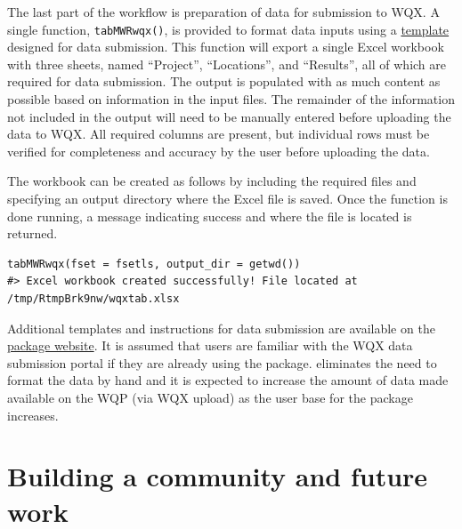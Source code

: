 The last part of the  workflow is preparation of data for submission to WQX. A single function, \texttt{tabMWRwqx()}, is provided to format data inputs using a \href{https://massbays-tech.github.io/MassWateR/RESOURCES.html}{template} designed for data submission. This function will export a single Excel workbook with three sheets, named ``Project'', ``Locations'', and ``Results'', all of which are required for data submission. The output is populated with as much content as possible based on information in the input files. The remainder of the information not included in the output will need to be manually entered before uploading the data to WQX. All required columns are present, but individual rows must be verified for completeness and accuracy by the user before uploading the data.

The workbook can be created as follows by including the required files and specifying an output directory where the Excel file is saved. Once the function is done running, a message indicating success and where the file is located is returned.

\begin{verbatim}
tabMWRwqx(fset = fsetls, output_dir = getwd())
#> Excel workbook created successfully! File located at /tmp/RtmpBrk9nw/wqxtab.xlsx
\end{verbatim}

Additional templates and instructions for data submission are available on the \href{https://massbays-tech.github.io/MassWateR/index.html}{package website}. It is assumed that users are familiar with the WQX data submission portal if they are already using the package.  eliminates the need to format the data by hand and it is expected to increase the amount of data made available on the WQP (via WQX upload) as the user base for the package increases.

\hypertarget{building-a-community-and-future-work}{%
\section{Building a community and future work}\label{building-a-community-and-future-work}}

